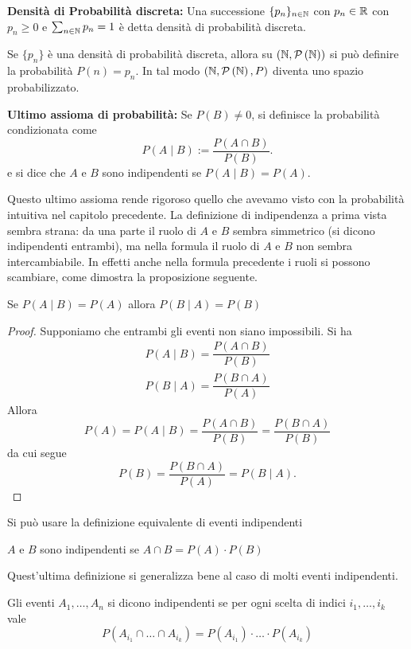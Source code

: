 \begin{defn}
	\textbf{Densit\`a di Probabilit\`a discreta:}
	Una successione $ \{p_n\}_{n \in \mathbb{N}} $ con $ p_n \in \mathbb{R} $ con $ p_n \geq 0 $ e $ \sum_{n \in \mathbb{N}} p_n = 1 $
	\`e detta densit\`a di probabilit\`a discreta.

	Se $ \{p_n\} $ \`e una densit\`a di probabilit\`a discreta, allora su $ ( \mathbb{N}, \mathcal{P}\left(\mathbb{N}\right)) $ si pu\`o definire la probabilit\`a $P(n)=p_n$. In tal modo $ ( \mathbb{N}, \mathcal{P}\left(\mathbb{N}\right),P) $ diventa uno spazio probabilizzato.
\end{defn}

\begin{defn}
	\textbf{Ultimo assioma di probabilit\`a:}
	Se $P(B)\neq0$, si definisce la probabilit\`a condizionata come $$ P(A \mid B) := \dfrac{P(A \cap B)}{P(B)} .$$
	e si dice che $A$ e $B$ sono indipendenti se  $ P(A \mid B) = P(A) $.
\end{defn}

Questo ultimo assioma rende rigoroso quello che avevamo visto con la probabilit\`a intuitiva nel capitolo precedente. La definizione di indipendenza a prima vista sembra strana: da una parte il ruolo di $A$ e $B$
sembra simmetrico (si dicono indipendenti entrambi), ma nella formula il ruolo di $A$ e $B$ non sembra
intercambiabile. In effetti anche nella formula precedente i ruoli si possono scambiare, come dimostra la 
proposizione seguente.
\begin{prop}
	Se $ P(A \mid B) = P(A)$ allora $P(B \mid A) = P(B) $
\end{prop}
\begin{proof} Supponiamo che entrambi gli eventi non siano impossibili. Si ha
	\begin{equation*}
	\begin{aligned}
		P(A \mid B) = \dfrac{P(A \cap B)}{P(B)} \\
		P(B \mid A) = \dfrac{P(B \cap A)}{P(A)}
	\end{aligned}
	\end{equation*}
Allora
$$
P(A)=P(A \mid B) = \dfrac{P(A \cap B)}{P(B)}= \dfrac{P(B \cap A)}{P(B)}
$$
da cui segue 
$$
P(B)= \dfrac{P(B \cap A)}{P(A)}=P(B \mid A).
$$
\end{proof}	
Si pu\`o usare la definizione equivalente di eventi indipendenti
\begin{defn}
$A$ e $B$ sono indipendenti se $A \cap B = P(A)\cdot P(B)$
\end{defn}
Quest'ultima definizione si generalizza bene al caso di molti eventi indipendenti.
\begin{defn}
Gli eventi $ A_1, \dots, A_n $ si dicono indipendenti se per ogni scelta di indici $i_1, \dots, i_k $ vale
	\begin{equation*}
	 P \left(A_{i_1}\cap\dots\cap A_{i_k}\right) = P(A_{i_1}) \cdot \dots \cdot P(A_{i_k})
	\end{equation*}
\end{defn}

